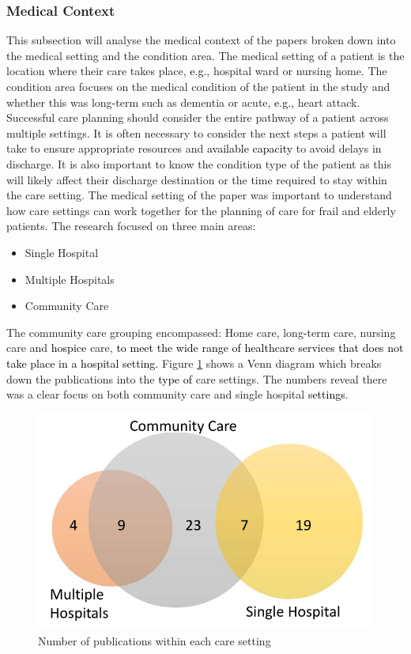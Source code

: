 \documentclass[../thesis.tex]{subfiles}
\begin{document}
\subsubsection{Medical Context}
This subsection will analyse the medical context of the papers broken down into the medical setting and the condition area. The medical setting of a patient is the location where their care takes place, \textcolor{black}{e.g.}, hospital ward or nursing home. The condition area focuses on the medical condition of the patient in the study and whether this was long\textcolor{black}{-}term such as dementia or acute\textcolor{black}{, e.g.,} heart attack. Successful care planning should consider the entire pathway of a patient across multiple settings. It is often necessary to consider the next steps a patient will take to ensure appropriate resources and \textcolor{black}{available capacity} to avoid delays in discharge. It is also important to know the condition type of the patient as this will likely affect their discharge destination or the time required to stay within the care setting. 
 \label{Medical Setting}
The medical setting of the paper was important to understand how care settings can work together for the planning of care for frail and elderly patients. The research focused on three main areas:

\begin{itemize}
    \item Single Hospital
    \item Multiple Hospitals
    \item Community Care
\end{itemize}

The community care grouping encompassed: Home care, long\textcolor{black}{-}term care, nursing care and \textcolor{black}{hospice} care, \textcolor{black}{to meet the wide range of healthcare services that does not take place in a hospital setting.}
Figure \ref{fig:VennDiag} shows a Venn diagram which breaks down the publications into the \textcolor{black}{type of} care settings. The numbers reveal there was a clear focus on both community care and single hospital \textcolor{black}{settings}.

\begin{figure}[h!]
\centering
  \includegraphics[scale=0.75]{Chapter2/Figures/Venn2.pdf}
\caption{Number of publications within each care setting}
\label{fig:VennDiag}  
\end{figure}
\end{document}
